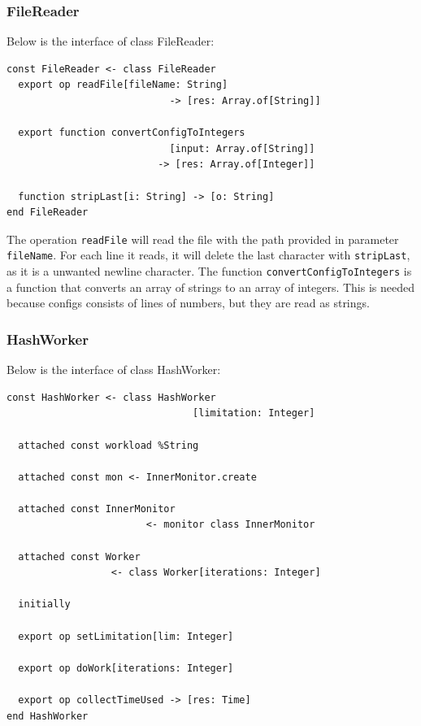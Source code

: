 

\subsubsection{FileReader}
Below is the interface of class FileReader:
\begin{lstlisting}[language=emerald]
const FileReader <- class FileReader
  export op readFile[fileName: String] 
                            -> [res: Array.of[String]]
                            
  export function convertConfigToIntegers
                            [input: Array.of[String]] 
                          -> [res: Array.of[Integer]]
                            
  function stripLast[i: String] -> [o: String]
end FileReader
\end{lstlisting}
The operation \verb|readFile| will read the file with the path provided in parameter \verb|fileName|. For each line it reads, it will delete the last character with \verb|stripLast|, as it is a unwanted newline character. The function \verb|convertConfigToIntegers| is a function that converts an array of strings to an array of integers. This is needed because configs consists of lines of numbers, but they are read as strings.



\subsubsection{HashWorker}
Below is the interface of class HashWorker:
\begin{lstlisting}[language=emerald]
const HashWorker <- class HashWorker
                                [limitation: Integer]
  
  attached const workload %String

  attached const mon <- InnerMonitor.create

  attached const InnerMonitor 
                        <- monitor class InnerMonitor

  attached const Worker
                  <- class Worker[iterations: Integer]

  initially

  export op setLimitation[lim: Integer]
  
  export op doWork[iterations: Integer]

  export op collectTimeUsed -> [res: Time]
end HashWorker
\end{lstlisting}




